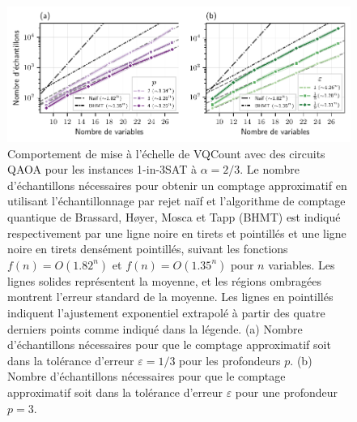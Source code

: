 \begin{figure}[H]
    \centering
    \includegraphics[width=1\textwidth]{figures/1in3sat-number-of-samples.pdf}
    \caption[Comportement d'échelle du nombre d'échantillons pour \#1-in-3SAT]{Comportement de mise à l'échelle de VQCount avec des circuits QAOA pour les instances 1-in-3SAT à $\alpha=2/3$. Le nombre d'échantillons nécessaires pour obtenir un comptage approximatif en utilisant l'échantillonnage par rejet naïf et l'algorithme de comptage quantique de Brassard, Høyer, Mosca et Tapp (BHMT) est indiqué respectivement par une ligne noire en tirets et pointillés et une ligne noire en tirets densément pointillés, suivant les fonctions $f(n) = O(1.82^{n})$ et $f(n) = O(1.35^{n})$ pour $n$ variables. Les lignes solides représentent la moyenne, et les régions ombragées montrent l'erreur standard de la moyenne. Les lignes en pointillés indiquent l'ajustement exponentiel extrapolé à partir des quatre derniers points comme indiqué dans la légende. (a) Nombre d'échantillons nécessaires pour que le comptage approximatif soit dans la tolérance d'erreur $\varepsilon = 1/3$ pour les profondeurs $p$. (b) Nombre d'échantillons nécessaires pour que le comptage approximatif soit dans la tolérance d'erreur $\varepsilon$ pour une profondeur $p=3$.}
    \label{fig:1in3sat-number-of-samples}
\end{figure}



